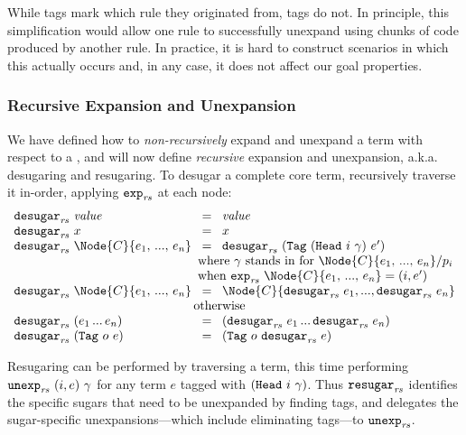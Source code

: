 While {\MacHeadf} tags mark which rule they originated from, {\MacBodyf}
tags do not. In principle, this
simplification would allow one rule to successfully unexpand using chunks
of code produced by another rule. In practice, it is hard to construct
scenarios in which this actually occurs and, in any case, it does not
affect our goal properties.

\subsubsection{Recursive Expansion and Unexpansion}
\label{sec:reval-expansion}

We have defined how to \emph{non-recursively} expand and unexpand a term
with respect to a {}, and will now define \emph{recursive}
expansion and unexpansion, a.k.a. desugaring and resugaring.
To desugar a complete core term,
recursively traverse it in-order,
applying $\texttt{exp}_{\mathit{rs}}$ at each node:
\[\begin{array}{lcl}
\ExpandRec{\Value} \!&=&\! \Value \\
\ExpandRec{\VarX} \!&=&\! \VarX \\
\ExpandRec{\Node{C}{e_1,\,...,\,e_n}} \!&=&\!
  \ExpandRec{\Tag{\MacHead{i}{\gamma}}{e'}} \\
  & \multicolumn{2}{l}{\text{
\hspace{-1em} where $\gamma$ stands in for $\Node{C}{e_1,\,...,\,e_n} \match p_i$}} \\
  & \multicolumn{2}{l}{\text{
\hspace{-1em} when $\Expand{\Node{C}{e_1,\,...,\,e_n}} = (i, e')$}} \\
\ExpandRec{\Node{C}{e_1,\,...,\,e_n}} \!&=&\!
  \Node{C}{\ExpandRec{e_1},...,\ExpandRec{e_n}} \\
& \multicolumn{2}{l}{\text{\hspace{-1em} otherwise}} \\
\ExpandRec{(e_1\,...\,e_n)} \!&=&\!
  (\ExpandRec{e_1}\,...\,\ExpandRec{e_n}) \\
\ExpandRec{\Tag{o}{e}} \!&=&\!
  \Tag{o}{\ExpandRec{e}}
\end{array}\]

Resugaring can be performed by traversing a term, this
time performing $\texttt{unexp}_{\mathit{rs}}\ {(i, e)}\ {\gamma}$ for any term $e$ tagged with
$(\texttt{Head}\ i\ \gamma)$. Thus $\texttt{resugar}_{\mathit{rs}}$ identifies the specific sugars
that need to be unexpanded by finding {\MacHeadf} tags, and delegates the
sugar-specific unexpansions---which include eliminating {\MacBodyf}
tags---to $\texttt{unexp}_{\mathit{rs}}$.

